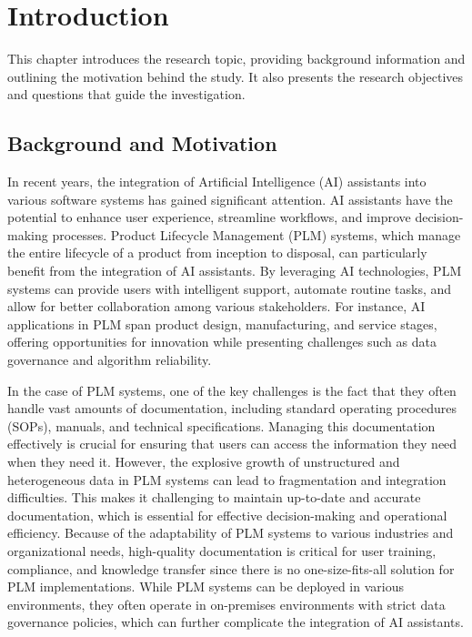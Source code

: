 \chapter{Introduction}
\label{ch:introduction}

This chapter introduces the research topic, providing background information and outlining the motivation behind the study. It also presents the research objectives and questions that guide the investigation.

\section{Background and Motivation}
\label{sec:background-and-motivation}

In recent years, the integration of Artificial Intelligence (AI) assistants into various software systems has gained significant attention. AI assistants have the potential to enhance user experience, streamline workflows, and improve decision-making processes. Product Lifecycle Management (PLM) systems, which manage the entire lifecycle of a product from inception to disposal\parencite{stark_product_2015}, can particularly benefit from the integration of AI assistants. By leveraging AI technologies, PLM systems can provide users with intelligent support, automate routine tasks, and allow for better collaboration among various stakeholders. For instance, AI applications in PLM span product design, manufacturing, and service stages, offering opportunities for innovation while presenting challenges such as data governance and algorithm reliability\parencite{wang_artificial_2021}.

In the case of PLM systems, one of the key challenges is the fact that they often handle vast amounts of documentation, including standard operating procedures (SOPs), manuals, and technical specifications. Managing this documentation effectively is crucial for ensuring that users can access the information they need when they need it. However, the explosive growth of unstructured and heterogeneous data in PLM systems can lead to fragmentation and integration difficulties\parencite{wang_artificial_2021}. This makes it challenging to maintain up-to-date and accurate documentation, which is essential for effective decision-making and operational efficiency. Because of the adaptability of PLM systems to various industries and organizational needs, high-quality documentation is critical for user training, compliance, and knowledge transfer since there is no one-size-fits-all solution for PLM implementations\parencite{stark_product_2015-1}. While PLM systems can be deployed in various environments\parencite{stark_product_2015-1}, they often operate in on-premises environments with strict data governance policies, which can further complicate the integration of AI assistants.

